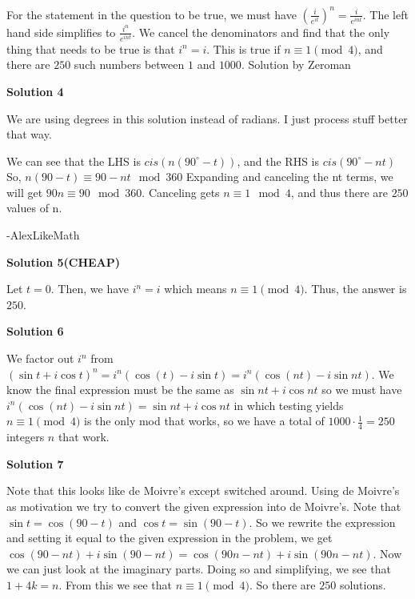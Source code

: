 \begin{enumerate}
 For the statement in the question to be true, we must have $\left(\frac{i}{e^{it}}\right)^n=\frac{i}{e^{int}}$. The left hand side simplifies to $\frac{i^n}{e^{int}}$. We cancel the denominators and find that the only thing that needs to be true is that $i^n=i$. This is true if $n\equiv1\pmod{4}$, and there are $\boxed{250}$ such numbers between $1$ and $1000$. Solution by Zeroman

 



\textbf{Solution 4}

We are using degrees in this solution instead of radians. I just process stuff better that way.

 We can see that the LHS is $cis(n(90^{\circ}-t))$, and the RHS is $cis(90^{\circ}-nt)$ So, $n(90-t) \equiv 90-nt \mod 360$ Expanding and canceling the nt terms, we will get $90n \equiv 90 \mod 360$. Canceling gets $n \equiv 1 \mod 4$, and thus there are $\boxed{250}$ values of n.

 -AlexLikeMath

 



\textbf{Solution 5(CHEAP)}

Let $t=0$. Then, we have $i^n=i$ which means $n\equiv 1\pmod{4}$. Thus, the answer is $\boxed{250}$.

 



\textbf{Solution 6}

We factor out $i^n$ from $(\sin t + i \cos t)^n = i^n (\cos(t) - i \sin t)= i^n(\cos(nt) - i\sin nt).$ We know the final expression must be the same as $\sin nt + i \cos nt$ so we must have $i^n(\cos(nt) - i\sin nt) = \sin nt + i \cos nt$ in which testing yields $n \equiv 1 \pmod{4}$ is the only mod that works, so we have a total of $1000 \cdot\frac{1}{4} = \boxed{250}$ integers $n$ that work.

 



\textbf{Solution 7}

Note that this looks like de Moivre's except switched around. Using de Moivre's as motivation we try to convert the given expression into de Moivre's. Note that $\sin t = \cos(90 - t)$ and $\cos t = \sin(90 - t)$. So we rewrite the expression and setting it equal to the given expression in the problem, we get $\cos(90 - nt) + i\sin(90 - nt) = \cos(90n - nt) + i\sin(90n - nt)$. Now we can just look at the imaginary parts. Doing so and simplifying, we see that $1 + 4k= n$. From this we see that $n \equiv 1\pmod{4}$. So there are $\boxed{250}$ solutions. 


\end{enumerate}
